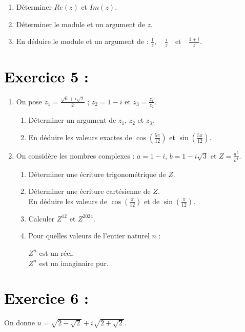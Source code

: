 \documentclass[12pt]{article}
\begin{document}
\begin{enumerate}
    \item Déterminer $Re(z)$ et $Im(z)$.
    \item Déterminer le module et un argument de $z$.
    \item En déduire le module et un argument de :
    \(
    \frac{1}{z}, \quad \frac{i}{z} \quad \text{et} \quad \frac{1 + i}{z}.
    \)
\end{enumerate}

\section*{\textcolor{black}{Exercice 5 :}}
\begin{enumerate}
    \item On pose $z_1 = \frac{\sqrt{6} + i\sqrt{2}}{2}$ ; $z_2 = 1 - i$ et $z_3 = \frac{z_1}{z_2}$.
    \begin{enumerate}
        \item Déterminer un argument de $z_1$, $z_2$ et $z_3$.
        \item En déduire les valeurs exactes de $\cos\left(\frac{5\pi}{12}\right)$ et $\sin\left(\frac{5\pi}{12}\right)$.
    \end{enumerate}
    \item On considère les nombres complexes : $a = 1 - i$, $b = 1 - i\sqrt{3}$ et $Z = \frac{a^5}{b^4}$.
    \begin{enumerate}
        \item Déterminer une écriture trigonométrique de $Z$.
        \item Déterminer une écriture cartésienne de $Z$. \\
        En déduire les valeurs de $\cos\left(\frac{\pi}{12}\right)$ et de $\sin\left(\frac{\pi}{12}\right)$.
        \item Calculer $Z^{12}$ et $Z^{2024}$.
        \item Pour quelles valeurs de l’entier naturel $n$ :
        
        $Z^{n}$ est un réel.\\
        $Z^{n}$ est un imaginaire pur.\\
    \end{enumerate}
\end{enumerate}
\section*{\textcolor{black}{Exercice 6 :}}
On donne $u = \sqrt{2 - \sqrt{2}} + i \sqrt{2 + \sqrt{2}}.$
\end{document}
